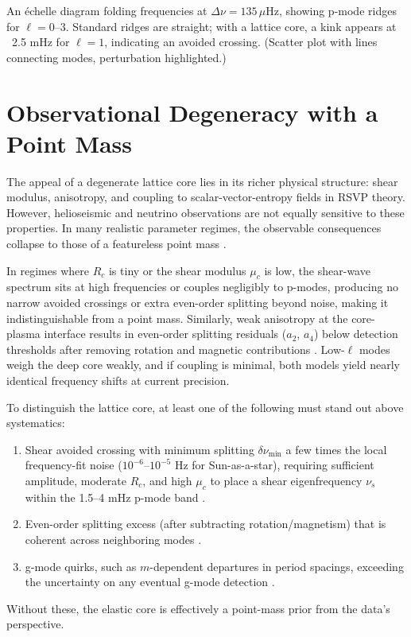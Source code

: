 \documentclass{article}
\begin{document}
An échelle diagram folding frequencies at $\Delta\nu = 135 \, \mu$Hz, showing p-mode ridges for $\ell=0$--3. Standard ridges are straight; with a lattice core, a kink appears at ~2.5 mHz for $\ell=1$, indicating an avoided crossing. (Scatter plot with lines connecting modes, perturbation highlighted.)

\section{Observational Degeneracy with a Point Mass}

The appeal of a degenerate lattice core lies in its richer physical structure: shear modulus, anisotropy, and coupling to scalar-vector-entropy fields in RSVP theory. However, helioseismic and neutrino observations are not equally sensitive to these properties. In many realistic parameter regimes, the observable consequences collapse to those of a featureless point mass \citep{bellinger2025}.

In regimes where $R_c$ is tiny or the shear modulus $\mu_c$ is low, the shear-wave spectrum sits at high frequencies or couples negligibly to p-modes, producing no narrow avoided crossings or extra even-order splitting beyond noise, making it indistinguishable from a point mass. Similarly, weak anisotropy at the core-plasma interface results in even-order splitting residuals ($a_2$, $a_4$) below detection thresholds after removing rotation and magnetic contributions \citep{aerts2010, lund2017}. Low-$\ell$ modes weigh the deep core weakly, and if coupling is minimal, both models yield nearly identical frequency shifts at current precision.

To distinguish the lattice core, at least one of the following must stand out above systematics:
\begin{enumerate}
\item Shear avoided crossing with minimum splitting $\delta \nu_{\min}$ a few times the local frequency-fit noise ($10^{-6}$--$10^{-5}$ Hz for Sun-as-a-star), requiring sufficient amplitude, moderate $R_c$, and high $\mu_c$ to place a shear eigenfrequency $\nu_s$ within the 1.5--4 mHz p-mode band \citep{aerts2010}.
\item Even-order splitting excess (after subtracting rotation/magnetism) that is coherent across neighboring modes \citep{lund2017}.
\item g-mode quirks, such as $m$-dependent departures in period spacings, exceeding the uncertainty on any eventual g-mode detection \citep{bellinger2025}.
\end{enumerate}
Without these, the elastic core is effectively a point-mass prior from the data’s perspective.
\end{document}
